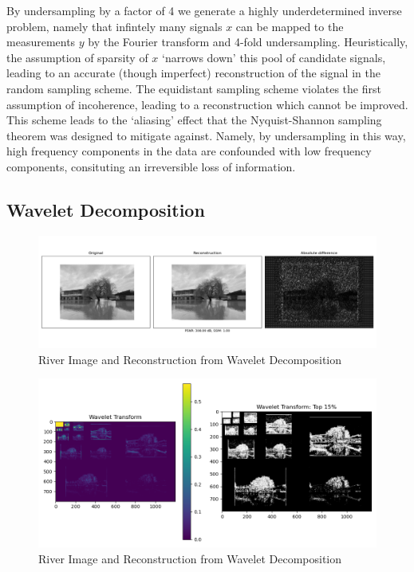 \documentclass[12pt]{article}
\begin{document}
By undersampling by a factor of 4 we generate a highly underdetermined inverse problem,
namely that infintely many signals $x$ can be mapped to the measurements $y$ by the Fourier transform and 4-fold undersampling.
Heuristically, the assumption of sparsity of $x$ `narrows down' this pool of candidate signals,
leading to an accurate (though imperfect) reconstruction of the signal in the random sampling scheme.
The equidistant sampling scheme violates the first assumption of incoherence,
leading to a reconstruction which cannot be improved.
This scheme leads to the `aliasing' effect that the Nyquist-Shannon sampling theorem was designed to mitigate against.
Namely, by undersampling in this way, high frequency components in the data are confounded with low frequency components,
consituting an irreversible loss of information.

\subsection{Wavelet Decomposition}

\begin{figure}[htp]
    \includegraphics[scale=0.35]{figures/river_img.png}
    \caption{River Image and Reconstruction from Wavelet Decomposition}
    \label{fig:river_img}
\end{figure}

\begin{figure}[htp]
    \includegraphics[scale=0.5]{figures/wavelet_transform.png}
    \caption{River Image and Reconstruction from Wavelet Decomposition}
    \label{fig:wavelet_transform}
\end{figure}
\end{document}
